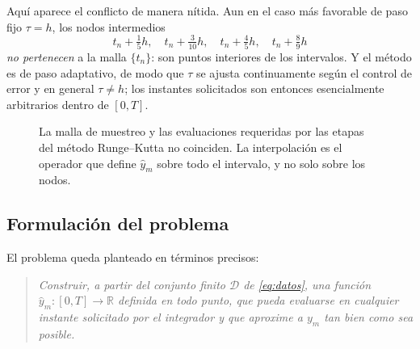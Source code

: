 \documentclass[12pt,a4paper]{article}
\newcommand{\R}{\mathbb{R}}
\begin{document}
Aquí aparece el conflicto de manera nítida. Aun en el caso más favorable de paso
fijo $\tau = h$, los nodos intermedios
\[
  t_n + \tfrac{1}{5}h,\quad
  t_n + \tfrac{3}{10}h,\quad
  t_n + \tfrac{4}{5}h,\quad
  t_n + \tfrac{8}{9}h
\]
\emph{no pertenecen} a la malla $\{t_n\}$: son puntos interiores de los intervalos.
Y el método es de paso adaptativo, de modo que $\tau$ se ajusta continuamente
según el control de error y en general $\tau \neq h$; los instantes solicitados son
entonces esencialmente arbitrarios dentro de $[0, T]$.

\begin{figure}[H]
\centering
{}
\caption{La malla de muestreo y las evaluaciones requeridas por las etapas del
método Runge--Kutta no coinciden. La interpolación es el operador que define
$\hat{y}_m$ sobre todo el intervalo, y no solo sobre los nodos.}
\label{fig:malla}
\end{figure}

\subsection{Formulación del problema}

El problema queda planteado en términos precisos:

\begin{quote}
\emph{Construir, a partir del conjunto finito $\mathcal{D}$ de \eqref{eq:datos},
una función $\hat{y}_m : [0,T] \to \R$ definida en todo punto, que pueda evaluarse
en cualquier instante solicitado por el integrador y que aproxime a $y_m$ tan bien
como sea posible.}
\end{quote}
\end{document}
